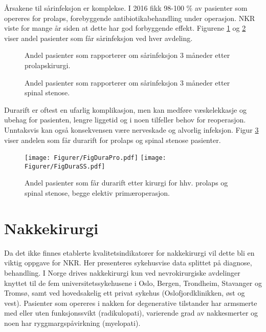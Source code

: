 Årsakene til sårinfeksjon er komplekse. I 2016 fikk 98-100 \% av pasienter som
opereres for prolaps, forebyggende antibiotikabehandling under operasjon. NKR
viste for mange år siden at dette har god forbyggende effekt. Figurene \ref{fig:KpInfAvdPro} og \ref{fig:KpInfAvdSS} viser andel pasienter som får sårinfeksjon ved hver avdeling.

\begin{figure}[ht]
\caption{\label{fig:KpInfAvdPro} Andel pasienter som rapporterer om sårinfeksjon 3 måneder etter
prolapskirurgi.} \end{figure}

\begin{figure}[ht]
\caption{\label{fig:KpInfAvdSS} Andel pasienter som rapporterer om sårinfeksjon 3 måneder etter
spinal stenose.} \end{figure}




Durarift er oftest en ufarlig komplikasjon, men kan medføre væskelekkasje og
ubehag for pasienten, lengre liggetid og i noen tilfeller behov for reoperasjon.
Unntaksvis kan også konsekvensen være nerveskade og alvorlig infeksjon. Figur \ref{fig:Dura} viser andelen som får durarift for prolaps og spinal stenose pasienter.

\begin{figure}[ht]
\centering \texttt{[image: Figurer/FigDuraPro.pdf]}
\centering \texttt{[image: Figurer/FigDuraSS.pdf]}
\caption{\label{fig:Dura} Andel pasienter som får durarift etter kirurgi for hhv. prolaps og spinal stenose, begge elektiv primæroperasjon.}
\end{figure}

























\clearpage




\section{Nakkekirurgi}
Da  det ikke finnes etablerte kvalitetsindikatorer for nakkekirurgi vil dette bli en
viktig oppgave for NKR.  Her presenteres sykehusvise
data splittet på diagnose, behandling.
I Norge drives nakkekirurgi kun ved nevrokirurgiske avdelinger knyttet til de fem
universitetssykehusene i Oslo, Bergen, Trondheim, Stavanger og Tromsø, samt ved
hovedsakelig ett privat sykehus (Oslofjordklinikken, øst og vest).
Pasienter som opereres i nakken for degenerative tilstander har armsmerte med eller uten funksjonssvikt (radikulopati), varierende grad av nakkesmerter og noen har ryggmargspåvirkning (myelopati). 
